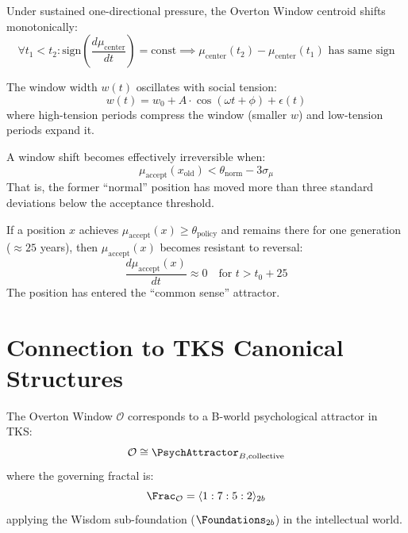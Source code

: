 \begin{theorem}
\label{thm:window-monotonicity}
Under sustained one-directional pressure, the Overton Window centroid shifts
monotonically:
\[
    \forall t_1 < t_2 : \mathrm{sign}\left(
        \frac{d\mu_{\mathrm{center}}}{dt} \right) = \mathrm{const}
    \implies \mu_{\mathrm{center}}(t_2) - \mu_{\mathrm{center}}(t_1) \text{ has same sign}
\]
\end{theorem}

\begin{theorem}
\label{thm:width-oscillation}
The window width $w(t)$ oscillates with social tension:
\[
    w(t) = w_0 + A \cdot \cos(\omega t + \phi) + \epsilon(t)
\]
where high-tension periods compress the window (smaller $w$) and low-tension
periods expand it.
\end{theorem}

\begin{theorem}
\label{thm:irreversibility}
A window shift becomes effectively irreversible when:
\[
    \mu_{\mathrm{accept}}(x_{\mathrm{old}}) < \theta_{\mathrm{norm}} -
    3\sigma_{\mu}
\]
That is, the former ``normal'' position has moved more than three standard
deviations below the acceptance threshold.
\end{theorem}

\begin{corollary}
\label{cor:generational}
If a position $x$ achieves $\mu_{\mathrm{accept}}(x) \geq \theta_{\mathrm{policy}}$
and remains there for one generation ($\approx 25$ years), then
$\mu_{\mathrm{accept}}(x)$ becomes resistant to reversal:
\[
    \frac{d\mu_{\mathrm{accept}}(x)}{dt} \approx 0 \quad \text{for } t > t_0 + 25
\]
The position has entered the ``common sense'' attractor.
\end{corollary}

\section{Connection to TKS Canonical Structures}
\label{sec:overton-tks-connection}

\begin{proposition}
\label{prop:overton-noetic}
The Overton Window $\mathcal{O}$ corresponds to a B-world psychological attractor
in TKS:
\[
    \mathcal{O} \cong \PsychAttractor_{B,\mathrm{collective}}
\]
where the governing fractal is:
\[
    \Frac_{\mathcal{O}} = \langle 1 : 7 : 5 : 2 \rangle_{2b}
\]
applying the Wisdom sub-foundation ($\Foundations_{2b}$) in the intellectual world.
\end{proposition}

